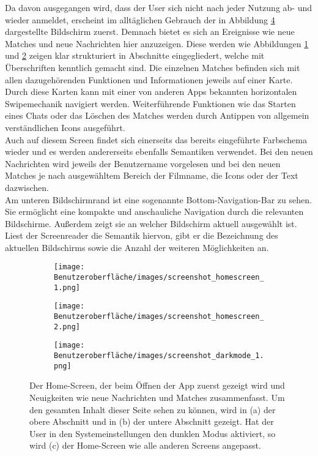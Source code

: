
Da davon ausgegangen wird, dass der User sich nicht nach jeder Nutzung ab- und wieder anmeldet, erscheint im alltäglichen Gebrauch der in Abbildung \ref{fig:homescreen_alle} dargestellte Bildschirm zuerst. Demnach bietet es sich an Ereignisse wie neue Matches und neue Nachrichten hier anzuzeigen. Diese werden wie Abbildungen \ref{fig:homescreen_a} und \ref{fig:homescreen_b} zeigen klar strukturiert in Abschnitte eingegliedert, welche mit Überschriften kenntlich gemacht sind. Die einzelnen Matches befinden sich mit allen dazugehörenden Funktionen und Informationen jeweils auf einer Karte. Durch diese Karten kann mit einer von anderen \mbox{Apps} bekannten horizontalen Swipemechanik navigiert werden. Weiterführende Funktionen wie das Starten eines Chats oder das Löschen des Matches werden durch  Antippen von allgemein verständlichen Icons ausgeführt. \\
Auch auf diesem Screen findet sich einerseits das bereits eingeführte Farbschema wieder und es werden andererseits ebenfalls Semantiken verwendet. Bei den neuen Nachrichten wird jeweils der Benutzername vorgelesen und bei den neuen Matches je nach ausgewähltem Bereich der Filmname, die Icons oder der Text dazwischen.\\
Am unteren Bildschirmrand ist eine sogenannte Bottom-Navigation-Bar zu sehen. Sie ermöglicht eine kompakte und anschauliche Navigation durch die relevanten Bildschirme. Außerdem zeigt sie an welcher Bildschirm aktuell ausgewählt ist. Liest der Screenreader die Semantik hiervon, gibt er die Bezeichnung des aktuellen Bildschirms sowie die Anzahl der weiteren Möglichkeiten an. \\

\begin{figure}[tbt]
	\begin{subfigure}{0.33\textwidth}
	\centering
	\texttt{[image: Benutzeroberfläche/images/screenshot\_homescreen\_1.png]}
	\caption{}
	\label{fig:homescreen_a}
	\end{subfigure}
	\begin{subfigure}{0.33\textwidth}
	\centering
	\texttt{[image: Benutzeroberfläche/images/screenshot\_homescreen\_2.png]}
	\caption{}
	\label{fig:homescreen_b}
	\end{subfigure}
	\begin{subfigure}{0.33\textwidth}
	\centering
	\texttt{[image: Benutzeroberfläche/images/screenshot\_darkmode\_1.png]}
	\caption{}
	\label{fig:homescreen_c}
	\end{subfigure}
\caption{Der Home-Screen, der beim Öffnen der App zuerst gezeigt wird und Neuigkeiten wie neue Nachrichten und Matches zusammenfasst. Um den gesamten Inhalt dieser Seite sehen zu können, wird in (a) der obere Abschnitt und in (b) der untere Abschnitt gezeigt. Hat der User in den Systemeinstellungen den dunklen Modus aktiviert, so wird (c) der Home-Screen wie alle anderen Screens angepasst.}
\label{fig:homescreen_alle}
\end{figure}

